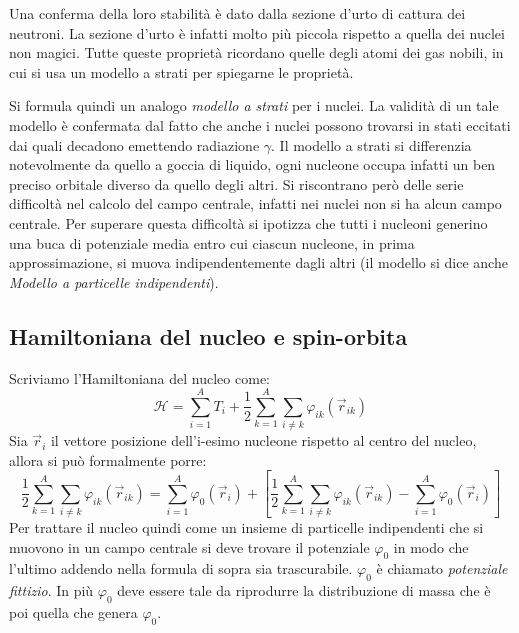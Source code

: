 Una conferma della loro stabilità è dato dalla sezione d'urto di cattura dei
neutroni. La sezione d'urto è infatti molto più piccola rispetto a quella dei
nuclei non magici. Tutte queste proprietà ricordano quelle degli atomi dei gas
nobili, in cui si usa un modello a strati per spiegarne le proprietà.

Si formula quindi un analogo \textit{modello a strati} per i nuclei. La 
validità
di un tale modello è confermata dal fatto che anche i nuclei possono trovarsi 
in
stati eccitati dai quali decadono emettendo radiazione $\gamma$. Il modello a
strati si differenzia notevolmente da quello a goccia di liquido, ogni nucleone
occupa infatti un ben preciso orbitale diverso da quello degli altri. Si
riscontrano però delle serie difficoltà nel calcolo del campo centrale, 
infatti
nei nuclei non si ha alcun campo centrale. Per superare questa difficoltà si
ipotizza che tutti i nucleoni generino una buca di potenziale media entro cui
ciascun nucleone, in prima approssimazione, si muova indipendentemente dagli
altri (il modello si dice anche \textit{Modello a particelle indipendenti}).


\subsection{Hamiltoniana del nucleo e  spin-orbita}
Scriviamo l'Hamiltoniana del nucleo come:
\begin{equation}
\mathcal{H} = \sum_{i=1}^A T_i + \frac{1}{2} \sum_{k=1}^A \sum_{i \ne k} 
\varphi_{ik}{\left( \vec{r}_{ik}\right)} 
\end{equation}
Sia $\vec{r}_i$ il vettore posizione dell'i-esimo nucleone rispetto al centro 
del nucleo, allora si può formalmente porre:
\begin{equation}
\frac{1}{2} \sum_{k=1}^A \sum_{i \ne k} \varphi_{ik}{\left( 
\vec{r}_{ik}\right)} = \sum_{i=1}^A \varphi_0{(\vec{r}_i)} + \left[ \frac{1}{2} 
\sum_{k=1}^A \sum_{i \ne k} \varphi_{ik}{\left( \vec{r}_{ik}\right)} - 
\sum_{i=1}^A \varphi_0{(\vec{r}_i)} \right] 
\end{equation}
Per trattare il nucleo quindi come un insieme di particelle indipendenti che si 
muovono in un campo centrale si deve trovare il potenziale $\varphi_0$ in modo 
che l'ultimo addendo nella formula di sopra sia trascurabile. $\varphi_0$ è 
chiamato \textit{potenziale fittizio}. In più $\varphi_0$ deve essere tale da 
riprodurre la distribuzione di massa che è poi quella che genera $\varphi_0$.

